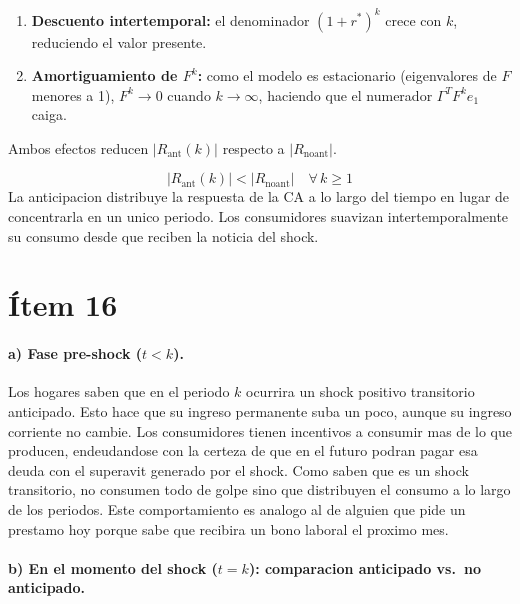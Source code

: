 \begin{enumerate}
    \item \textbf{Descuento intertemporal:} el denominador $(1+r^*)^k$ crece con $k$, reduciendo el valor presente.
    \item \textbf{Amortiguamiento de $F^k$:} como el modelo es estacionario (eigenvalores de $F$ menores a 1), $F^k \to 0$ cuando $k \to \infty$, haciendo que el numerador $\Gamma^T F^k e_1$ caiga.
\end{enumerate}

Ambos efectos reducen $|R_{\text{ant}}(k)|$ respecto a $|R_{\text{noant}}|$.

\begin{resultado}
\[
    |R_{\text{ant}}(k)| < |R_{\text{noant}}| \quad \forall\, k \geq 1
\]
La anticipacion distribuye la respuesta de la CA a lo largo del tiempo en lugar de concentrarla en un unico periodo. Los consumidores suavizan intertemporalmente su consumo desde que reciben la noticia del shock.
\end{resultado}

\section*{Ítem 16}

\paragraph{a) Fase pre-shock ($t < k$).}

Los hogares saben que en el periodo $k$ ocurrira un shock positivo transitorio anticipado. Esto hace que su ingreso permanente suba un poco, aunque su ingreso corriente no cambie. Los consumidores tienen incentivos a consumir mas de lo que producen, endeudandose con la certeza de que en el futuro podran pagar esa deuda con el superavit generado por el shock. Como saben que es un shock transitorio, no consumen todo de golpe sino que distribuyen el consumo a lo largo de los periodos. Este comportamiento es analogo al de alguien que pide un prestamo hoy porque sabe que recibira un bono laboral el proximo mes.

\paragraph{b) En el momento del shock ($t = k$): comparacion anticipado vs.\ no anticipado.}

